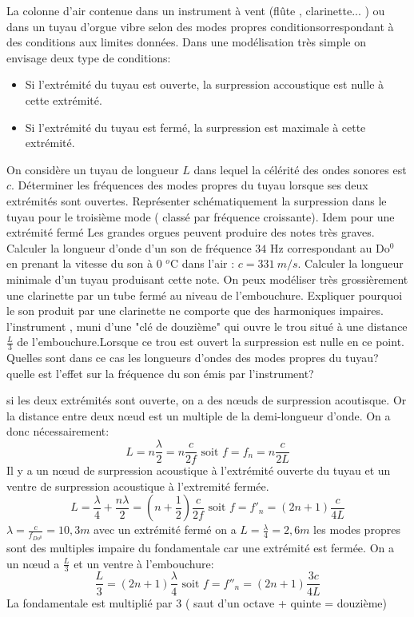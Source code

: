 \begin{Exercise}[title=Fréquence propre d'un tuyau]
	La colonne d'air contenue dans un instrument à vent (flûte , clarinette... ) ou dans un tuyau d'orgue vibre selon des modes propres conditionsorrespondant à des conditions aux limites données. Dans une modélisation très simple on envisage deux type de  conditions:
	\begin{itemize}
		\item Si l'extrémité du tuyau est ouverte, la surpression accoustique est nulle à cette extrémité.
		\item Si l'extrémité du tuyau est fermé, la surpression est maximale à cette extrémité.
	\end{itemize}
	\Question On considère un tuyau de longueur $L$ dans lequel la  célérité des ondes sonores est $c$.
	\subQuestion Déterminer les fréquences des modes propres du tuyau lorsque ses deux extrémités sont ouvertes. Représenter schématiquement la surpression dans le tuyau pour le troisième mode ( classé par fréquence croissante).
	\subQuestion Idem pour une extrémité fermé
	\Question Les grandes orgues peuvent produire des notes très graves.
    Calculer la longueur d'onde d'un son de fréquence $34$ Hz correspondant au
    Do$^0$ en prenant la vitesse du son à 0 $^o$C dans l'air : $c=331~m/s$. Calculer la longueur minimale d'un tuyau produisant cette note.
	\Question On peux modéliser très grossièrement une clarinette par un tube fermé au niveau de l'embouchure.
	\subQuestion Expliquer pourquoi le son produit par une clarinette ne comporte que des harmoniques impaires.
	\subQuestion l'instrument , muni d'une "clé de douzième" qui ouvre le trou situé à une distance $\frac{L}{3}$ de l'embouchure.Lorsque ce trou est ouvert la surpression est nulle en ce point. Quelles sont dans ce cas les longueurs d'ondes des modes propres du tuyau? quelle est l'effet sur la fréquence du son émis par l'instrument?
\end{Exercise}
\begin{Answer}
	\Question
	\subQuestion si les deux extrémités sont ouverte, on a des nœuds de surpression acoutisque. Or la distance entre deux nœud est un multiple de la demi-longueur d'onde. On a donc nécessairement:
	\[L= n \frac{\lambda}{2} = n\frac{c}{2f} \text{ soit } f=f_n=n\frac{c}{2L}\]
	\subQuestion Il y a un nœud de surpression acoustique à l'extrémité ouverte du tuyau et un ventre de surpression acoustique à l'extremité fermée.
	\[L=\frac{\lambda}{4}+\frac{n\lambda}{2}=\left(n+\frac{1}{2}\right)\frac{c}{2f} \text{ soit }f=f'_n=(2n+1)\frac{c}{4L}\]
	\Question $\lambda=\frac{c}{f_{Do^0}}=10,3 m$ avec un extrémité fermé on a $L=\frac{\lambda}{4}=2,6m$
	\Question
	\subQuestion les modes propres sont des multiples impaire du fondamentale car une extrémité est fermée.
	\subQuestion On a un nœud a $\frac{L}{3}$ et un ventre à l'embouchure:
	\[ \frac{L}{3}=(2n+1)\frac{\lambda}{4} \text{ soit } f=f''_n=(2n+1)\frac{3c}{4L}\]
	La fondamentale est multiplié par 3 ( saut d'un octave + quinte = douzième)
\end{Answer}
